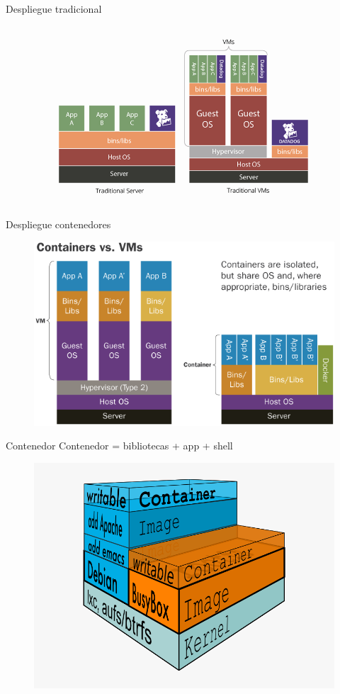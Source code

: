 \documentclass{beamer}
\begin{document}
\begin{frame}{Despliegue tradicional}
\begin{figure}
\centering
\includegraphics[width=0.8\linewidth]{Images/traditional}
\label{fig:traditional}
\end{figure}
\end{frame}

\begin{frame}{Despliegue contenedores}
\begin{figure}
\centering
\includegraphics[width=0.8\linewidth]{Images/containervsvm.png}
\label{fig:containervsvm}
\end{figure}
\end{frame}

\begin{frame}{Contenedor}
Contenedor = bibliotecas + app + shell
\begin{figure}
\centering
\includegraphics[width=0.8\linewidth]{Images/container.png}
\label{fig:container}
\end{figure}
\end{frame}
\end{document}
